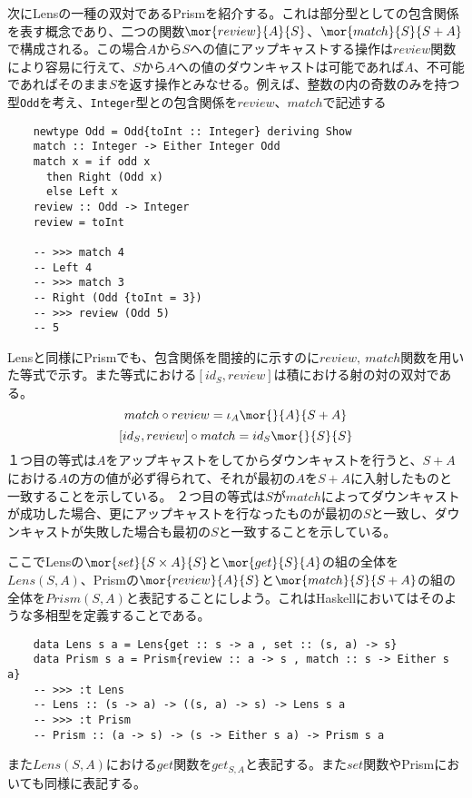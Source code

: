 \documentclass[uplatex,dvipdfmx]{jsarticle}
\newcommand{\pr}[1]{\colorbox[rgb]{0.9,0.9,0.9}{\lstinline{#1}}}
\begin{document}
  次にLensの一種の双対であるPrismを紹介する。これは部分型としての包含関係を表す概念であり、二つの関数$\mor{review}{A}{S}$、$\mor{match}{S}{S+A}$で構成される。この場合$A$から$S$への値にアップキャストする操作は$review$関数により容易に行えて、$S$から$A$への値のダウンキャストは可能であれば$A$、不可能であればそのまま$S$を返す操作とみなせる。例えば、整数の内の奇数のみを持つ型\pr{Odd}を考え、\pr{Integer}型との包含関係を$review$、$match$で記述する
  \begin{lstlisting}   
    newtype Odd = Odd{toInt :: Integer} deriving Show
    match :: Integer -> Either Integer Odd
    match x = if odd x 
      then Right (Odd x)
      else Left x
    review :: Odd -> Integer
    review = toInt

    -- >>> match 4
    -- Left 4
    -- >>> match 3
    -- Right (Odd {toInt = 3})
    -- >>> review (Odd 5)
    -- 5
  \end{lstlisting}
  Lensと同様にPrismでも、包含関係を間接的に示すのに$review,\ match$関数を用いた等式で示す。また等式における$[id_S,review]$は積における射の対の双対である。
  \[match\circ review = \iota_A\mor{}{A}{S+A}\]
  \[[id_S,review]\circ match = id_S\mor{}{S}{S}\]
  １つ目の等式は$A$をアップキャストをしてからダウンキャストを行うと、$S+A$における$A$の方の値が必ず得られて、それが最初の$A$を$S+A$に入射したものと一致することを示している。
  ２つ目の等式は$S$が$match$によってダウンキャストが成功した場合、更にアップキャストを行なったものが最初の$S$と一致し、ダウンキャストが失敗した場合も最初の$S$と一致することを示している。
  
  ここでLensの$\mor{set}{S\times A}{S}$と$\mor{get}{S}{A}$の組の全体を$Lens(S,A)$、Prismの$\mor{review}{A}{S}$と$\mor{match}{S}{S+A}$の組の全体を$Prism(S,A)$と表記することにしよう。これはHaskellにおいてはそのような多相型を定義することである。
  \begin{lstlisting}
    data Lens s a = Lens{get :: s -> a , set :: (s, a) -> s}
    data Prism s a = Prism{review :: a -> s , match :: s -> Either s a}
    -- >>> :t Lens
    -- Lens :: (s -> a) -> ((s, a) -> s) -> Lens s a
    -- >>> :t Prism
    -- Prism :: (a -> s) -> (s -> Either s a) -> Prism s a
  \end{lstlisting}

  また$Lens(S,A)$における$get$関数を$get_{S,A}$と表記する。また$set$関数やPrismにおいても同様に表記する。
  
\end{document}
